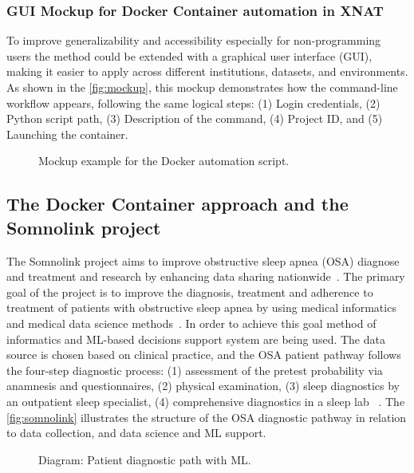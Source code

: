 \normalsize
\subsubsection{GUI Mockup for Docker Container automation in XNAT}
\normalsize
To improve generalizability and accessibility especially for non-programming users the method could be extended with a graphical user interface (GUI), making it easier to apply across different institutions, datasets, and environments.  As shown in the \autoref{fig:mockup}, this mockup demonstrates how the command-line workflow appears, following the same logical steps: (1) Login credentials, (2) Python script path, (3) Description of the command, (4) Project ID, and (5) Launching the container.
\normalsize
\begin{figure}[H]
    \centering
    \def\svgwidth{\linewidth} 
    
    \caption{ Mockup example for the Docker automation script.}
    \label{fig:mockup}
\end{figure}
\normalsize
\subsection{The Docker Container approach and the Somnolink project}

The Somnolink project aims to improve obstructive sleep apnea (OSA) diagnose and  treatment and research by enhancing data sharing nationwide~\cite{krefting_somnolink_2025}. The primary goal of the project is to improve the diagnosis, treatment and adherence to treatment of patients with obstructive sleep apnea by using medical informatics and medical data science methods~\cite{aimsomnilink}.
In order to achieve this goal method of informatics and ML-based decisions support system are being used. 
The data source is chosen based on clinical practice, and the OSA patient pathway follows the four-step diagnostic process: (1) assessment of the pretest probability via anamnesis and questionnaires, (2) physical examination, (3) sleep diagnostics by an outpatient sleep specialist, (4) comprehensive diagnostics in a sleep lab ~\cite{krefting_somnolink_2025}.
The \autoref{fig:somnolink} illustrates the structure of the OSA diagnostic pathway in relation to data collection, and data science and ML support.
\begin{figure}[H]
    \centering
    \def\svgwidth{\linewidth} 
    
    \caption{Diagram: Patient diagnostic path with ML.}
    \label{fig:somnolink}
\end{figure}

